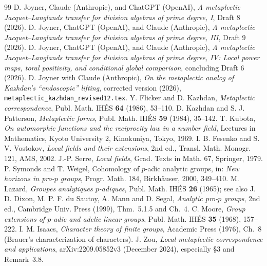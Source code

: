 \documentclass[11pt]{article}
\theoremstyle{plain}
\theoremstyle{definition}
\begin{document}
\begin{thebibliography}{99}
 D. Joyner, Claude (Anthropic), and ChatGPT (OpenAI),
\emph{A metaplectic Jacquet--Langlands transfer for division
algebras of prime degree, I}, Draft 8 (2026).
 D. Joyner, ChatGPT (OpenAI), and Claude (Anthropic),
\emph{A metaplectic Jacquet--Langlands transfer for division
algebras of prime degree, III}, Draft 9 (2026).
 D. Joyner, ChatGPT (OpenAI), and Claude (Anthropic),
\emph{A metaplectic Jacquet--Langlands transfer for division
algebras of prime degree, IV: Local power maps, toral positivity,
and conditional global comparison}, concluding Draft 6 (2026).
 D. Joyner with Claude (Anthropic),
\emph{On the metaplectic analog of Kazhdan's ``endoscopic'' lifting},
corrected version (2026), \texttt{metaplectic\_kazhdan\_revised12.tex}.
 Y. Flicker and D. Kazhdan,
\emph{Metaplectic correspondence}, Publ. Math. IH\'ES
\textbf{64} (1986), 53--110.
 D. Kazhdan and S. J. Patterson, \emph{Metaplectic forms},
Publ. Math. IH\'ES \textbf{59} (1984), 35--142.
 T. Kubota, \emph{On automorphic functions and the
reciprocity law in a number field}, Lectures in Mathematics, Kyoto
University 2, Kinokuniya, Tokyo, 1969.
 I. B. Fesenko and S. V. Vostokov, \emph{Local fields and
their extensions}, 2nd ed., Transl. Math. Monogr. 121, AMS, 2002.
 J.-P. Serre, \emph{Local fields}, Grad. Texts in Math.
67, Springer, 1979.
 P. Symonds and T. Weigel, Cohomology of $p$-adic analytic
groups, in: \emph{New horizons in pro-$p$ groups}, Progr. Math. 184,
Birkh\"auser, 2000, 349--410.
 M. Lazard, \emph{Groupes analytiques $p$-adiques},
Publ. Math. IH\'ES \textbf{26} (1965); see also J. D. Dixon, M. P. F. du
Sautoy, A. Mann and D. Segal, \emph{Analytic pro-$p$ groups}, 2nd ed.,
Cambridge Univ. Press (1999), Thm.~5.1.5 and Ch.~4.
 C. Moore, \emph{Group extensions of $p$-adic and adelic
linear groups}, Publ. Math. IH\'ES \textbf{35} (1968), 157--222.
 I. M. Isaacs, \emph{Character theory of finite groups},
Academic Press (1976), Ch.~8 (Brauer's characterization of characters).
 J. Zou,
\emph{Local metaplectic correspondence and applications},
arXiv:2209.05852v3 (December 2024), especially \S3 and Remark~3.8.
\end{thebibliography}
\end{document}
